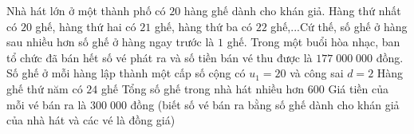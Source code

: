 \begin{ex}%
Nhà hát lớn ở một thành phố có $20$ hàng ghế dành cho khán giả. Hàng thứ nhất có $20$ ghế, hàng thứ hai có $21$ ghế, hàng thứ ba có $22$ ghế,...Cứ thế, số ghế ở hàng sau nhiều hơn số ghế ở hàng ngay trước là $1$ ghế. Trong một buổi hòa nhạc, ban tổ chức đã bán hết số vé phát ra và số tiền bán vé thu được là $177\;000\;000$ đồng.
	\choiceTF
	{Số ghế ở mỗi hàng lập thành một cấp số cộng có $u_1=20$ và công sai $d=2$}
	{\True Hàng ghế thứ năm có $24$ ghế}
	{Tổng số ghế trong nhà hát nhiều hơn $600$}
	{\True Giá tiền của mỗi vé bán ra là $300\;000$ đồng (biết số vé bán ra bằng số ghế dành cho khán giả của nhà hát và các vé là đồng giá)}
\end{ex}

